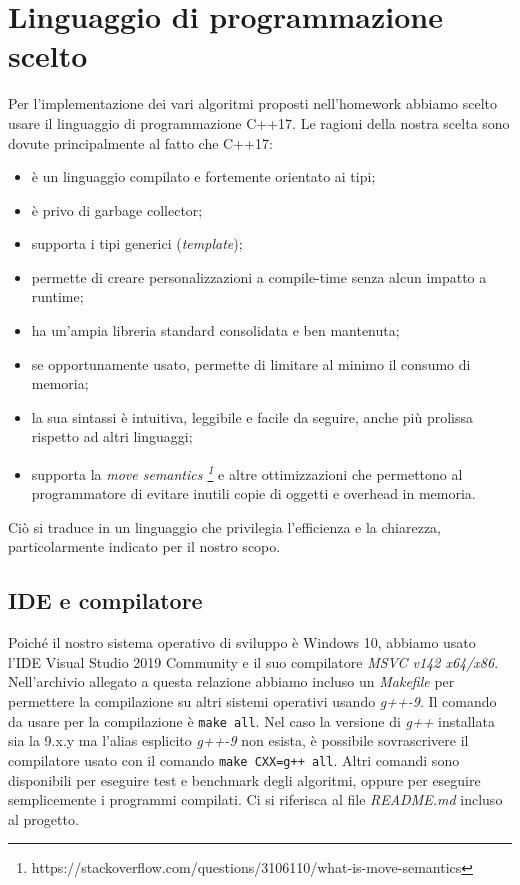 \section{Linguaggio di programmazione scelto}
\label{cap:language-choice}

Per l'implementazione dei vari algoritmi proposti nell'homework abbiamo scelto usare il linguaggio di programmazione
C++17. Le ragioni della nostra scelta sono dovute principalmente al fatto che C++17:

\begin{itemize}
    \item è un linguaggio compilato e fortemente orientato ai tipi;
    \item è privo di garbage collector;
    \item supporta i tipi generici (\textit{template});
    \item permette di creare personalizzazioni a compile-time senza alcun impatto a runtime;
    \item ha un'ampia libreria standard consolidata e ben mantenuta;
    \item se opportunamente usato, permette di limitare al minimo il consumo di memoria;
    \item la sua sintassi è intuitiva, leggibile e facile da seguire, anche più prolissa rispetto ad altri linguaggi;
    \item supporta la \textit{move semantics \footnote{https://stackoverflow.com/questions/3106110/what-is-move-semantics} } e altre ottimizzazioni che permettono al programmatore di evitare inutili copie di oggetti e overhead in memoria.
\end{itemize}
Ciò si traduce in un linguaggio che privilegia l'efficienza e la chiarezza, particolarmente indicato per il nostro scopo.

\subsection{IDE e compilatore}

Poiché il nostro sistema operativo di sviluppo è Windows 10, abbiamo usato l'IDE Visual Studio 2019 Community e il suo compilatore \textit{MSVC v142 x64/x86}. \\

\noindent Nell'archivio allegato a questa relazione abbiamo incluso un \textit{Makefile} per permettere la compilazione su altri sistemi operativi usando \textit{g++-9}. Il comando da usare per la compilazione è \texttt{make all}. Nel caso la versione di \textit{g++} installata sia la 9.x.y ma l'alias esplicito \textit{g++-9} non esista, è possibile sovrascrivere il compilatore usato con il comando \texttt{make CXX=g++ all}. Altri comandi sono disponibili per eseguire test e benchmark degli algoritmi, oppure per eseguire semplicemente i programmi compilati. Ci si riferisca al file \textit{README.md} incluso al progetto.
